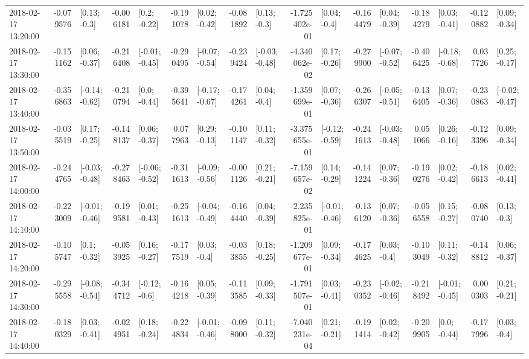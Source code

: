 \begin{tabular}{lrlrlrlrlrlrlrlrl}
2018-02-17 13:20:00 & -0.079576 &    [0.13; -0.3] & -0.006181 &    [0.2; -0.22] & -0.191078 &   [0.02; -0.42] & -0.081892 &    [0.13; -0.3] & -1.725402e-01 &    [0.04; -0.4] & -0.164479 &   [0.04; -0.39] & -0.184279 &   [0.03; -0.41] & -0.120882 &   [0.09; -0.34] \\
2018-02-17 13:30:00 & -0.151162 &   [0.06; -0.37] & -0.216408 &  [-0.01; -0.45] & -0.290495 &  [-0.07; -0.54] & -0.239424 &  [-0.03; -0.48] & -4.340062e-02 &   [0.17; -0.26] & -0.279900 &  [-0.07; -0.52] & -0.406425 &  [-0.18; -0.68] &  0.037726 &   [0.25; -0.17] \\
2018-02-17 13:40:00 & -0.356863 &  [-0.14; -0.62] & -0.210794 &    [0.0; -0.44] & -0.395641 &  [-0.17; -0.67] & -0.174261 &    [0.04; -0.4] & -1.359699e-01 &   [0.07; -0.36] & -0.266307 &  [-0.05; -0.51] & -0.136405 &   [0.07; -0.36] & -0.230863 &  [-0.02; -0.47] \\
2018-02-17 13:50:00 & -0.035519 &   [0.17; -0.25] & -0.148137 &   [0.06; -0.37] &  0.077963 &   [0.29; -0.13] & -0.101147 &   [0.11; -0.32] & -3.375655e-01 &  [-0.12; -0.59] & -0.241613 &  [-0.03; -0.48] &  0.051066 &   [0.26; -0.16] & -0.123396 &   [0.09; -0.34] \\
2018-02-17 14:00:00 & -0.244765 &  [-0.03; -0.48] & -0.278463 &  [-0.06; -0.52] & -0.311613 &  [-0.09; -0.56] & -0.001126 &   [0.21; -0.21] & -7.159657e-02 &   [0.14; -0.29] & -0.141224 &   [0.07; -0.36] & -0.190276 &   [0.02; -0.42] & -0.186613 &   [0.02; -0.41] \\
2018-02-17 14:10:00 & -0.223009 &  [-0.01; -0.46] & -0.199581 &   [0.01; -0.43] & -0.251613 &  [-0.04; -0.49] & -0.164440 &   [0.04; -0.39] & -2.235825e-01 &  [-0.01; -0.46] & -0.136120 &   [0.07; -0.36] & -0.056558 &   [0.15; -0.27] & -0.080740 &    [0.13; -0.3] \\
2018-02-17 14:20:00 & -0.105747 &    [0.1; -0.32] & -0.053925 &   [0.16; -0.27] & -0.177519 &    [0.03; -0.4] & -0.033855 &   [0.18; -0.25] & -1.209677e-01 &   [0.09; -0.34] & -0.174625 &    [0.03; -0.4] & -0.103049 &   [0.11; -0.32] & -0.148812 &   [0.06; -0.37] \\
2018-02-17 14:30:00 & -0.295558 &  [-0.08; -0.54] & -0.344712 &   [-0.12; -0.6] & -0.164218 &   [0.05; -0.39] & -0.113585 &   [0.09; -0.33] & -1.791507e-01 &   [0.03; -0.41] & -0.230352 &  [-0.02; -0.46] & -0.218492 &  [-0.01; -0.45] &  0.000303 &   [0.21; -0.21] \\
2018-02-17 14:40:00 & -0.180329 &   [0.03; -0.41] & -0.024951 &   [0.18; -0.24] & -0.224834 &  [-0.01; -0.46] & -0.098000 &   [0.11; -0.32] & -7.040231e-04 &   [0.21; -0.21] & -0.191414 &   [0.02; -0.42] & -0.209905 &    [0.0; -0.44] & -0.177996 &    [0.03; -0.4] \\

\end{tabular}
